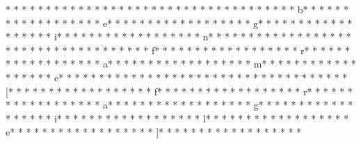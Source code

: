 * * *  * * *  * * *  *  * * *  *  * * *  * %
* * *  * * *  * * *  *  * * *  *  * * *  * b* * *  * * *  * * *  *  * * *  *  * * *  * e* * *  * * *  * * *  *  * * *  *  * * *  * g* * *  * * *  * * *  *  * * *  *  * * *  * i* * *  * * *  * * *  *  * * *  *  * * *  * n* * *  * * *  * * *  *  * * *  *  * * *  * {* * *  * * *  * * *  *  * * *  *  * * *  * f* * *  * * *  * * *  *  * * *  *  * * *  * r* * *  * * *  * * *  *  * * *  *  * * *  * a* * *  * * *  * * *  *  * * *  *  * * *  * m* * *  * * *  * * *  *  * * *  *  * * *  * e* * *  * * *  * * *  *  * * *  *  * * *  * }* * *  * * *  * * *  *  * * *  *  * * *  * [* * *  * * *  * * *  *  * * *  *  * * *  * f* * *  * * *  * * *  *  * * *  *  * * *  * r* * *  * * *  * * *  *  * * *  *  * * *  * a* * *  * * *  * * *  *  * * *  *  * * *  * g* * *  * * *  * * *  *  * * *  *  * * *  * i* * *  * * *  * * *  *  * * *  *  * * *  * l* * *  * * *  * * *  *  * * *  *  * * *  * e* * *  * * *  * * *  *  * * *  *  * * *  * ]* * *  * * *  * * *  *  * * *  *  * * *  * 
